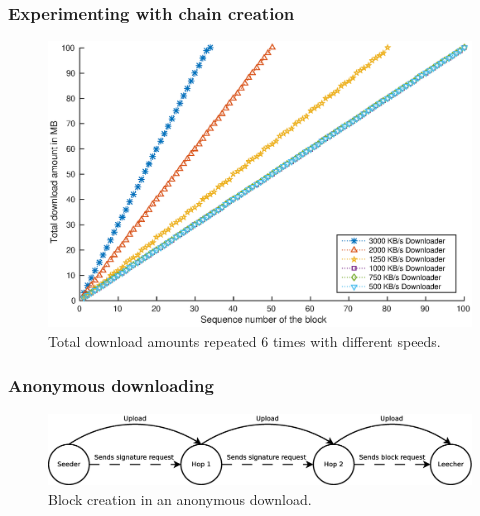\documentclass{beamer}
\begin{document}
\begin{frame}
\frametitle{Experimenting with chain creation}

\begin{figure}
\centerline{\includegraphics[scale=0.5]{images/experimentation/synthetic-simple-down.eps}}
\caption{Total download amounts repeated 6 times with different speeds.}
\end{figure}
\end{frame}

\begin{frame}
\frametitle{Anonymous downloading}

\begin{figure}
	\centerline{\includegraphics[scale=0.25]{images/experimentation/seeder-hops-downloader.eps}}
	\caption{Block creation in an anonymous download.}
	\label{fig:seeder-hops-downloader}
\end{figure}
\end{frame}
\end{document}
